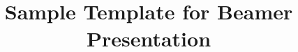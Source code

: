 \documentclass[xcolor=dvipsnames,compress,t,pdf,9pt]{beamer}
\title[\insertframenumber /\inserttotalframenumber]{Sample Template for Beamer Presentation}
\begin{document}
	\begin{frame}
	\titlepage
%
	\end{frame}
	
	
	
\end{document}
